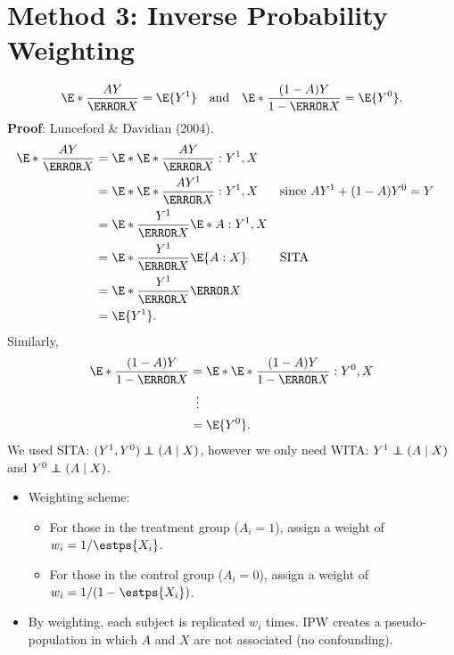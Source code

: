 \section{Method 3: Inverse Probability Weighting}
\begin{Result}{}
      \[ \E*{\frac{AY}{\ps{X}}}=\E{Y^1}\quad\text{and}\quad \E*{\frac{(1-A)Y}{1-\ps{X}}}=\E{Y^0}. \]
      \tcblower{}
      \textbf{Proof}: Lunceford \& Davidian (2004).
      \begin{align*}
            \E*{\frac{AY}{\ps{X}}}
             & =\E*{\E*{\frac{AY}{\ps{X}}\given Y^1,X}}                                       \\
             & =\E*{\E*{\frac{AY^1}{\ps{X}}\given Y^1,X}} &  & \text{since $AY^1+(1-A)Y^0=Y$} \\
             & =\E*{\frac{Y^1}{\ps{X}}\E*{A\given Y^1,X}}                                     \\
             & =\E*{\frac{Y^1}{\ps{X}}\E{A\given X}}      &  & \text{SITA}                    \\
             & =\E*{\frac{Y^1}{\ps{X}}\ps{X}}                                                 \\
             & =\E{Y^1}.
      \end{align*}
      Similarly,
      \begin{align*}
            \E*{\frac{(1-A)Y}{1-\ps{X}}}
             & =\E*{\E*{\frac{(1-A)Y}{1-\ps{X}}\given Y^0,X}} \\
             & \vdotswithin{=}                                \\
             & =\E{Y^0}.
      \end{align*}
      We used SITA\@: $ (Y^1,Y^0)\indep (A\mid X) $, however we only need WITA\@: $ Y^1\indep (A\mid X) $ and $ Y^0\indep(A\mid X) $.
\end{Result}
\begin{itemize}
      \item Weighting scheme:
            \begin{itemize}
                  \item For those in the treatment group ($ A_i=1 $), assign a weight of $ w_i=1/\estps{X_i} $.
                  \item For those in the control group ($ A_i=0 $), assign a weight of $ w_i=1/(1-\estps{X_i}) $.
            \end{itemize}
      \item By weighting, each subject is replicated $ w_i $ times. IPW creates
            a pseudo-population in which $ A $ and $ X $ are not associated (no confounding).
\end{itemize}
